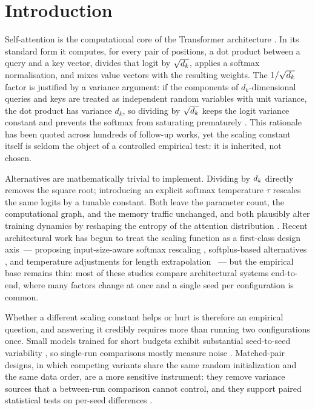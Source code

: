 \section{Introduction}\label{sec:intro}

Self-attention is the computational core of the Transformer architecture
\cite{vaswani2017}. In its standard form it computes, for every pair of positions,
a dot product between a query and a key vector, divides that logit by
$\sqrt{d_k}$, applies a softmax normalisation, and mixes value vectors with the
resulting weights. The $1/\sqrt{d_k}$ factor is justified by a variance argument:
if the components of $d_k$-dimensional queries and keys are treated as independent
random variables with unit variance, the dot product has variance $d_k$, so
dividing by $\sqrt{d_k}$ keeps the logit variance constant and prevents the
softmax from saturating prematurely \cite{vaswani2017}. This rationale has been
quoted across hundreds of follow-up works, yet the scaling constant itself is
seldom the object of a controlled empirical test: it is inherited, not chosen.

Alternatives are mathematically trivial to implement. Dividing by $d_k$ directly
removes the square root; introducing an explicit softmax temperature
$\tau$ \cite{hinton2015} rescales the same logits by a tunable constant. Both
leave the parameter count, the computational graph, and the memory traffic
unchanged, and both plausibly alter training dynamics by reshaping the entropy of
the attention distribution \cite{zhang2022temp,zhai2023,dong2021}. Recent
architectural work has begun to treat the scaling function as a first-class
design axis~--- proposing input-size-aware softmax rescaling \cite{nakanishi2025},
softplus-based alternatives \cite{gao2025}, and temperature adjustments for
length extrapolation \cite{chi2023}~--- but the empirical base remains thin:
most of these studies compare architectural systems end-to-end, where many
factors change at once and a single seed per configuration is common.

Whether a different scaling constant helps or hurt is therefore an empirical
question, and answering it credibly requires more than running two configurations
once. Small models trained for short budgets exhibit substantial seed-to-seed
variability \cite{bouthillier2021,picard2021}, so single-run comparisons mostly
measure noise \cite{dodge2019}. Matched-pair designs, in which competing variants
share the same random initialization and the same data order, are a more
sensitive instrument: they remove variance sources that a between-run comparison
cannot control, and they support paired statistical tests on per-seed differences
\cite{dror2018}.

